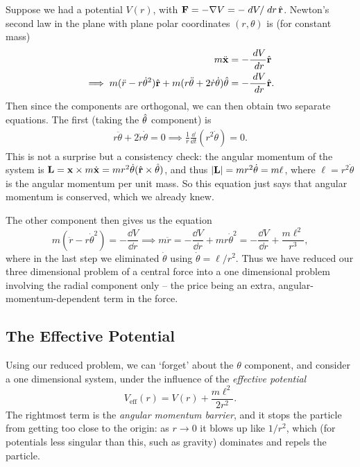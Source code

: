\documentclass[a4paper]{scrartcl}
\newcommand{\hh}[1]{\hat{\vv{#1}}}
\begin{document}
Suppose we had a potential $V(r)$, with $\vv F = - \nabla V = - \dd V/\dd r \, \hh r$. Newton's second law in the plane with plane polar coordinates $(r, \theta)$ is (for constant mass)
\begin{align*}
	m \ddot{\vv x} &= - \frac{\dd V}{\dd r} \hh r \\
\implies m (\ddot{r} - r \dot{\theta}^2) \hh r + m (r \ddot{\theta} + 2 \dot{r} \dot{\theta}) \hh \theta &= -\frac{\dd V}{\dd r} \hh r.
\end{align*}
Then since the components are orthogonal, we can then obtain two separate equations. The first (taking the $\hh \theta$ component) is
\begin{align*}
	r \ddot{\theta} + 2 \dot{r} \dot{\theta} = 0 \implies \frac{1}{r} \frac{\dd}{\dd t}(r^2 \dot{\theta}) = 0.
\end{align*}
This is not a surprise but a consistency check: the angular momentum of the system is $\vv L = \vv x \times m \dot{\vv x} = m r^2 \dot{\theta} (\hh r \times \hh \theta)$, and thus $|\mathbf{L}| = m r^2 \dot{\theta} = m \ell$, where $\ell = r^2 \dot\theta$ is the angular momentum per unit mass. So this equation just says that angular momentum is conserved, which we already knew.

The other component then gives us the equation
$$
m(\ddot{r} - r \dot{\theta}^2) = - \frac{\dd V}{\dd r} \implies m \ddot{r} = -\frac{\dd V}{\dd r} + m r \dot{\theta}^2 = - \frac{\dd V}{\dd r} + \frac{m\ell^2}{r^3},
$$
where in the last step we eliminated $\dot\theta$ using $\dot\theta = \ell/r^2$. Thus we have reduced our three dimensional problem of a central force into a one dimensional problem involving the radial component only -- the price being an extra, angular-momentum-dependent term in the force.

\subsection{The Effective Potential}

Using our reduced problem, we can `forget' about the $\theta$ component, and consider a one dimensional system, under the influence of the \emph{effective potential}
$$
V_{\text{eff}}(r) = V(r) + \frac{m \ell^2}{2r^2}.
$$
The rightmost term is the \emph{angular momentum barrier}, and it stops the particle from getting too close to the origin: as $r \to 0$ it blows up like $1/r^2$, which (for potentials less singular than this, such as gravity) dominates and repels the particle.
\end{document}
